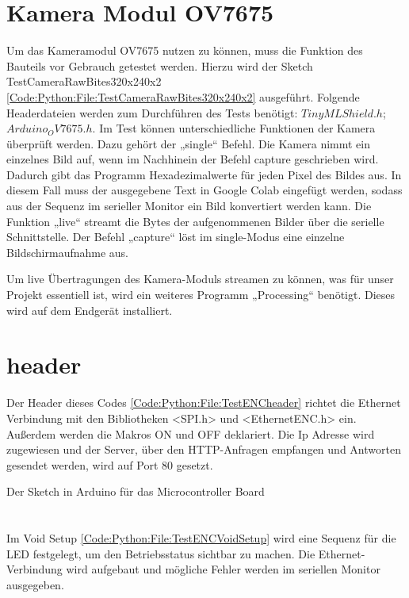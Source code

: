 \section{Kamera Modul OV7675}
Um das Kameramodul OV7675 nutzen zu können, muss die Funktion des Bauteils vor Gebrauch getestet werden. Hierzu wird der Sketch TestCameraRawBites320x240x2 \ref{Code:Python:File:TestCameraRawBites320x240x2} ausgeführt.
Folgende Headerdateien werden zum Durchführen des Tests benötigt: $TinyMLShield.h$; $Arduino_OV7675.h$.
Im Test können unterschiedliche Funktionen der Kamera überprüft werden. Dazu gehört der „single“ Befehl. Die Kamera nimmt ein einzelnes Bild auf, wenn im Nachhinein der Befehl capture geschrieben wird. Dadurch gibt das Programm Hexadezimalwerte für jeden Pixel des Bildes aus. In diesem Fall muss der ausgegebene Text in Google Colab eingefügt werden, sodass aus der Sequenz im serieller Monitor ein Bild konvertiert werden kann.
Die Funktion „live“ streamt die Bytes der aufgenommenen Bilder über die serielle Schnittstelle.
Der Befehl „capture“ löst im single-Modus eine einzelne Bildschirmaufnahme aus.

Um live Übertragungen des Kamera-Moduls streamen zu können, was für unser Projekt essentiell  ist, wird ein weiteres Programm „Processing“ benötigt. Dieses wird auf dem Endgerät installiert.

\section{header}
Der Header dieses Codes \ref{Code:Python:File:TestENCheader} richtet die Ethernet Verbindung mit den Bibliotheken <SPI.h> und <EthernetENC.h> ein. Außerdem werden die Makros ON und OFF deklariert. Die Ip Adresse wird zugewiesen und der Server, über den HTTP-Anfragen empfangen und Antworten gesendet werden, wird auf Port 80 gesetzt.

\begin{code}
        
    \caption[Sketch  ]{Der Sketch   in Arduino für das Microcontroller Board}
    \label{Code:Python:File:TestENCheader}    
\end{code} 

\section{}

Im Void Setup \ref{Code:Python:File:TestENCVoidSetup} wird eine Sequenz für die LED festgelegt, um den Betriebsstatus sichtbar zu machen. Die Ethernet-Verbindung wird aufgebaut und mögliche Fehler werden im seriellen Monitor ausgegeben.


